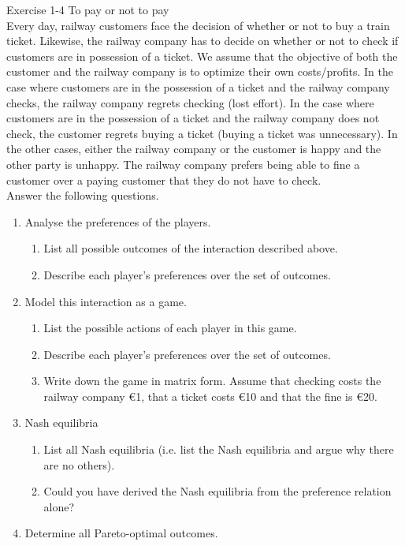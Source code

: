 \documentclass[../main.tex]{subfiles}
\begin{document}
\begin{question}
Exercise 1-4 To pay or not to pay\\

Every day, railway customers face the decision of whether or not to buy a train ticket. Likewise, the railway company has to decide on whether or not to check if customers are in possession of a ticket. We assume that the objective of both the customer and the railway company is to optimize their own costs/profits. In the case where customers are in the possession of a ticket and the railway company checks, the railway company regrets checking (lost effort). In the case where customers are in the possession of a ticket and the railway company does not check, the customer regrets buying a ticket (buying a ticket was unnecessary). In the other cases, either the railway company or the customer is happy and the other party is unhappy. The railway company prefers being able to fine a customer over a paying customer that they do not have to check.\\

Answer the following questions.
\begin{enumerate}
	\item Analyse the preferences of the players.
	\begin{enumerate}
		\item List all possible outcomes of the interaction described above.
		\item Describe each player’s preferences over the set of outcomes.
	\end{enumerate}
	\item Model this interaction as a game.
	\begin{enumerate}
		\item List the possible actions of each player in this game.
		\item Describe each player’s preferences over the set of outcomes.
		\item Write down the game in matrix form. Assume that checking costs the railway company \euro1, that a ticket costs \euro10 and that the fine is \euro20.
	\end{enumerate}
	
	\item Nash equilibria
	\begin{enumerate}
		\item List all Nash equilibria (i.e. list the Nash equilibria and argue why there are no others). 
		\item Could you have derived the Nash equilibria from the preference relation alone?
	\end{enumerate}
	
	\item Determine all Pareto-optimal outcomes.
		
\end{enumerate}


\end{question}
\end{document}
